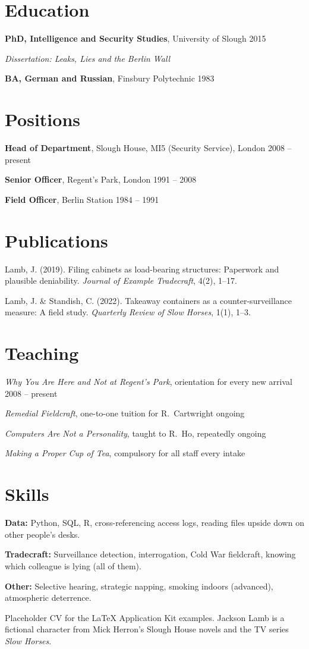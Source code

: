 \documentclass[11pt]{article}
\newcommand{\entry}[2]{#1 \hfill {\color{color3}#2}\par}
\begin{document}
\makeletterhead
{}

\section{Education}
\entry{\textbf{PhD, Intelligence and Security Studies}, University of Slough}{2015}
\hspace*{1.5em}\textit{Dissertation: Leaks, Lies and the Berlin Wall}\par
\entry{\textbf{BA, German and Russian}, Finsbury Polytechnic}{1983}

\section{Positions}
\entry{\textbf{Head of Department}, Slough House, MI5 (Security Service), London}{2008 -- present}
\entry{\textbf{Senior Officer}, Regent's Park, London}{1991 -- 2008}
\entry{\textbf{Field Officer}, Berlin Station}{1984 -- 1991}

\section{Publications}
Lamb, J. (2019). Filing cabinets as load-bearing structures: Paperwork and plausible deniability. \textit{Journal of Example Tradecraft}, 4(2), 1--17.\par
\vspace{4pt}
Lamb, J. \& Standish, C. (2022). Takeaway containers as a counter-surveillance measure: A field study. \textit{Quarterly Review of Slow Horses}, 1(1), 1--3.

\section{Teaching}
\entry{\textit{Why You Are Here and Not at Regent's Park}, orientation for every new arrival}{2008 -- present}
\entry{\textit{Remedial Fieldcraft}, one-to-one tuition for R.\ Cartwright}{ongoing}
\entry{\textit{Computers Are Not a Personality}, taught to R.\ Ho, repeatedly}{ongoing}
\entry{\textit{Making a Proper Cup of Tea}, compulsory for all staff}{every intake}

\section{Skills}
\textbf{Data:} Python, SQL, R, cross-referencing access logs, reading files upside down on other people's desks.\par
\textbf{Tradecraft:} Surveillance detection, interrogation, Cold War fieldcraft, knowing which colleague is lying (all of them).\par
\textbf{Other:} Selective hearing, strategic napping, smoking indoors (advanced), atmospheric deterrence.

\vfill
\begin{center}\small\color{color3}Placeholder CV for the LaTeX Application Kit examples. Jackson Lamb is a fictional character from Mick Herron's Slough House novels and the TV series \textit{Slow Horses}.\end{center}
\end{document}
